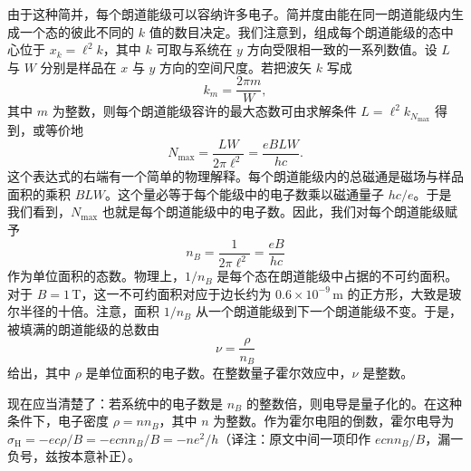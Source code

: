 由于这种简并，每个朗道能级可以容纳许多电子。简并度由能在同一朗道能级内生成一个态的彼此不同的 $k$ 值的数目决定。我们注意到，组成每个朗道能级的态中心位于 $x_{k}=\ell^{2}k$，其中 $k$ 可取与系统在 $y$ 方向受限相一致的一系列数值。设 $L$ 与 $W$ 分别是样品在 $x$ 与 $y$ 方向的空间尺度。若把波矢 $k$ 写成
\begin{equation*}
k_{m}=\frac{2\pi m}{W},\tag{15.18}
\end{equation*}
其中 $m$ 为整数，则每个朗道能级容许的最大态数可由求解条件 $L=\ell^{2}k_{N_{\mathrm{max}}}$ 得到，或等价地
\begin{equation*}
N_{\mathrm{max}}=\frac{LW}{2\pi\ell^{2}}=\frac{eBLW}{hc}.\tag{15.19}
\end{equation*}
这个表达式的右端有一个简单的物理解释。每个朗道能级内的总磁通是磁场与样品面积的乘积 $BLW$。这个量必等于每个能级中的电子数乘以磁通量子 $hc/e$。于是我们看到，$N_{\mathrm{max}}$ 也就是每个朗道能级中的电子数。因此，我们对每个朗道能级赋予
\begin{equation*}
n_{B}=\frac{1}{2\pi\ell^{2}}=\frac{eB}{hc}\tag{15.20}
\end{equation*}
作为单位面积的态数。物理上，$1/n_{B}$ 是每个态在朗道能级中占据的不可约面积。对于 $B=1\,$T，这一不可约面积对应于边长约为 $0.6\times10^{-9}\,\mathrm{m}$ 的正方形，大致是玻尔半径的十倍。注意，面积 $1/n_{B}$ 从一个朗道能级到下一个朗道能级不变。于是，被填满的朗道能级的总数由
\begin{equation*}
\nu=\frac{\rho}{n_{B}}\tag{15.21}
\end{equation*}
给出，其中 $\rho$ 是单位面积的电子数。在整数量子霍尔效应中，$\nu$ 是整数。

现在应当清楚了：若系统中的电子数是 $n_{B}$ 的整数倍，则电导是量子化的。在这种条件下，电子密度 $\rho=nn_{B}$，其中 $n$ 为整数。作为霍尔电阻的倒数，霍尔电导为 $\sigma_{\mathrm{H}}=-ec\rho/B=-ecnn_{B}/B=-ne^{2}/h$（译注：原文中间一项印作 $ecnn_{B}/B$，漏一负号，兹按本意补正）。

